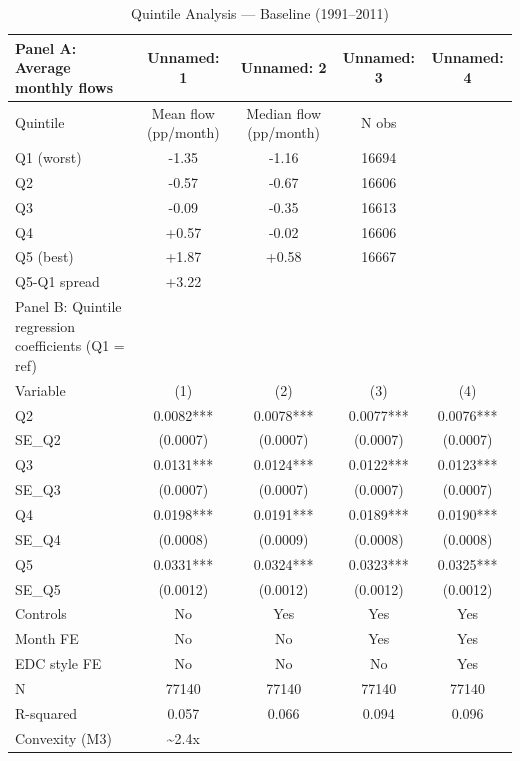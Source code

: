 \begin{table}[htbp]
\centering
\caption{Quintile Analysis --- Baseline (1991--2011)}
\label{tab:quintile_baseline}
\small
\begin{tabular}{lcccc}
\toprule
Panel A: Average monthly flows & Unnamed: 1 & Unnamed: 2 & Unnamed: 3 & Unnamed: 4 \\
\midrule
Quintile & Mean flow (pp/month) & Median flow (pp/month) & N obs &  \\
Q1 (worst) & -1.35 & -1.16 & 16694 &  \\
Q2 & -0.57 & -0.67 & 16606 &  \\
Q3 & -0.09 & -0.35 & 16613 &  \\
Q4 & +0.57 & -0.02 & 16606 &  \\
Q5 (best) & +1.87 & +0.58 & 16667 &  \\
Q5-Q1 spread & +3.22 &  &  &  \\
Panel B: Quintile regression coefficients (Q1 = ref) &  &  &  &  \\
Variable & (1) & (2) & (3) & (4) \\
Q2 & 0.0082*** & 0.0078*** & 0.0077*** & 0.0076*** \\
SE\_Q2 & (0.0007) & (0.0007) & (0.0007) & (0.0007) \\
Q3 & 0.0131*** & 0.0124*** & 0.0122*** & 0.0123*** \\
SE\_Q3 & (0.0007) & (0.0007) & (0.0007) & (0.0007) \\
Q4 & 0.0198*** & 0.0191*** & 0.0189*** & 0.0190*** \\
SE\_Q4 & (0.0008) & (0.0009) & (0.0008) & (0.0008) \\
Q5 & 0.0331*** & 0.0324*** & 0.0323*** & 0.0325*** \\
SE\_Q5 & (0.0012) & (0.0012) & (0.0012) & (0.0012) \\
Controls & No & Yes & Yes & Yes \\
Month FE & No & No & Yes & Yes \\
EDC style FE & No & No & No & Yes \\
N & 77140 & 77140 & 77140 & 77140 \\
R-squared & 0.057 & 0.066 & 0.094 & 0.096 \\
Convexity (M3) & \textasciitilde 2.4x &  &  &  \\
\bottomrule
\end{tabular}
\end{table}
